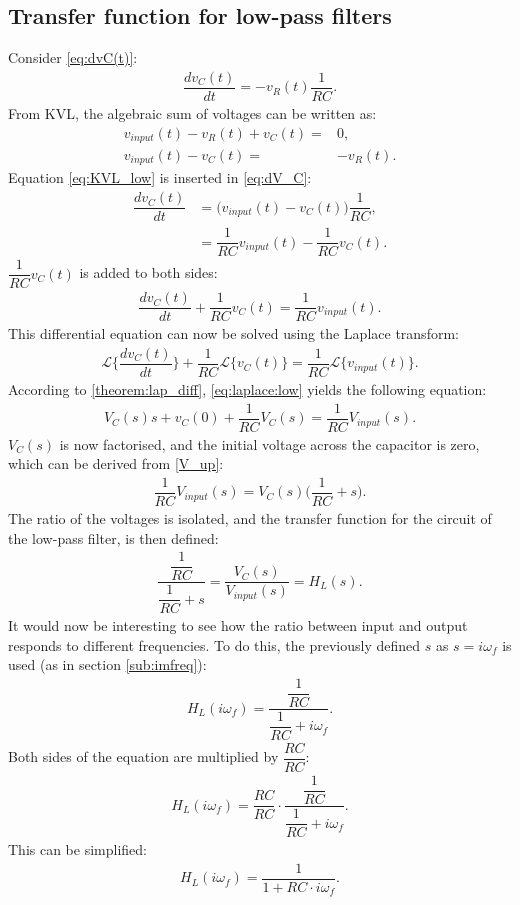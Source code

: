 \subsection{Transfer function for low-pass filters}
Consider \eqref{eq:dvC(t)}:
\begin{align} \label{eq:dV_C}
\dfrac{dv_C(t)}{dt}=-v_R(t)\dfrac{1}{RC}.
\end{align}
From KVL, the algebraic sum of voltages can be written as: 
\begin{align}
v_{input}(t)-v_{R}(t)+v_{C}(t)=&0,\nonumber
\\
 v_{input}(t) - v_{C}(t)=&-v_{R}(t). \label{eq:KVL_low}
\end{align}
Equation \eqref{eq:KVL_low} is inserted in \eqref{eq:dV_C}:
\begin{align*} 
\dfrac{dv_C(t)}{dt}&=\Big(v_{input}(t) - v_{C}(t)\Big)\dfrac{1}{RC},
\\
&=\dfrac{1}{RC}v_{input}(t) - \dfrac{1}{RC}v_{C}(t).
\end{align*}
$\dfrac{1}{RC}v_C(t)$ is added to both sides:
\begin{align*}
\dfrac{dv_C(t)}{dt}+\dfrac{1}{RC}v_C(t)=\dfrac{1}{RC}v_{input}(t).
\end{align*}
This differential equation can now be solved using the Laplace transform:
\begin{align}\label{eq:laplace:low}\mathcal{L}\bigg\{\dfrac{dv_C(t)}{dt}\bigg\}+\dfrac{1}{RC}\mathcal{L}\Big\{v_C(t)\Big\}=\dfrac{1}{RC}\mathcal{L}\Big\{v_{input}(t)\Big\}.
\end{align}
According to \cref{theorem:lap_diff}, \eqref{eq:laplace:low} yields the following equation:
\begin{align*}
V_C(s)s+v_C(0)+\dfrac{1}{RC}V_C(s)=\dfrac{1}{RC}V_{input}(s).
\end{align*} 
$V_{C}(s)$ is now factorised, and the initial voltage across the capacitor is zero, which can be derived from \eqref{V_up}:
\begin{align*}
\dfrac{1}{RC}V_{input}(s)=V_{C}(s)\Big(\dfrac{1}{RC}+s\Big).
\end{align*} 
The ratio of the voltages is isolated, and the transfer function for the circuit of the low-pass filter, is then defined:
\begin{align*}
\dfrac{\dfrac{1}{RC}}{\dfrac{1}{RC}+s} = \dfrac{V_{C}(s)}{V_{input}(s)}=H_L(s).
\end{align*}
It would now be interesting to see how the ratio between input and output responds to different frequencies. To do this, the previously defined $s$ as $s=i\omega_f$ is used (as in section \ref{sub:imfreq}):
\begin{align} \label{eq:trans_low}
H_{L}(i \omega_f) = \dfrac{\dfrac{1}{RC}}{\dfrac{1}{RC}+i \omega_f}. 
\end{align}
Both sides of the equation are multiplied by $\dfrac{RC}{RC}$:
\begin{align*}
H_{L}(i \omega_f) = \dfrac{RC}{RC} \cdot \dfrac{\dfrac{1}{RC}}{\dfrac{1}{RC}+i \omega_f}. 
\end{align*}
This can be simplified:
\begin{align*}
H_{L}(i \omega_f) =  \dfrac{1}{1+RC \cdot i \omega_f}. 
\end{align*}

